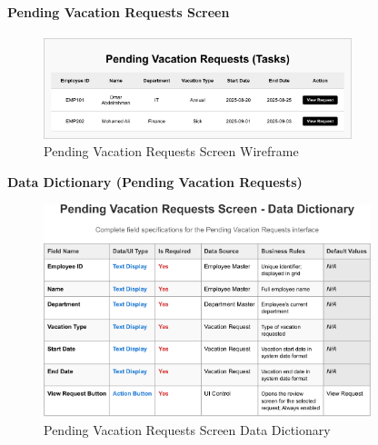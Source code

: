\documentclass[12pt,a4paper]{article}
\begin{document}
\paragraph{Pending Vacation Requests Screen}
\begin{figure}[H]
\centering
\includegraphics[width=0.8\textwidth]{Wireframes/Pending-Vacation-Requests/Pending-Vacation-Requests-1.png}
\caption{Pending Vacation Requests Screen Wireframe}
\label{fig:wireframe-pending-vacation-requests}
\end{figure}

\noindent\textbf{Data Dictionary (Pending Vacation Requests)}
\begin{figure}[H]
\centering
\includegraphics[width=0.85\textwidth]{Data-Dictionary/Screen-Data-Dictionaries/Pending-Vacation-Requests-Screen-Data-Dictionary/Pending-Vacation-Requests-Screen-Data-Dictionary-1.png}
\caption{Pending Vacation Requests Screen Data Dictionary}
\label{fig:pending-vacation-requests-data-dict-inline}
\end{figure}
\end{document}
